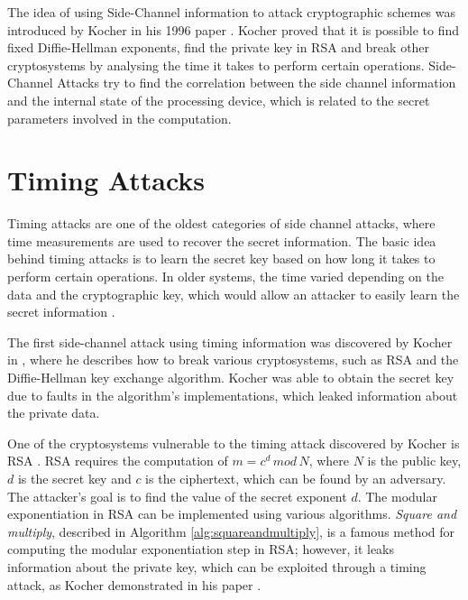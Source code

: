 \documentclass[10pt,a4paper,twoside]{book}
\begin{document}
The idea of using Side-Channel information to attack cryptographic schemes was introduced by Kocher in his 1996 paper \cite{kocher1996timing}. Kocher proved that it is possible to find fixed Diffie-Hellman \cite{diffie1976new} exponents, find the private key in RSA \cite{rivest1978method} and break other cryptosystems by analysing the time it takes to perform certain operations. Side-Channel Attacks try to find the correlation between the side channel information and the internal state of the processing device, which is related to the secret parameters involved in the computation. 

\section{Timing Attacks}
\label{tb:timingattacks}

Timing attacks are one of the oldest categories of side channel attacks, where time measurements are used to recover the secret information. The basic idea behind timing attacks is to learn the secret key based on how long it takes to perform certain operations. In older systems, the time varied depending on the data and the cryptographic key, which would allow an attacker to easily learn the secret information \cite{Koeune2011}.

The first side-channel attack using timing information was discovered by Kocher in \cite{kocher1996timing}, where he describes how to break various cryptosystems, such as RSA \cite{rivest1978method} and the Diffie-Hellman \cite{diffie1976new} key exchange algorithm. Kocher was able to obtain the secret key due to faults in the algorithm's implementations, which leaked information about the private data.

One of the cryptosystems vulnerable to the timing attack discovered by Kocher \cite{kocher1996timing} is RSA \cite{rivest1978method}. RSA requires the computation of $m = c^d \, mod \, N$, where $N$ is the public key, $d$ is the secret key and $c$ is the ciphertext, which can be found by an adversary. The attacker's goal is to find the value of the secret exponent $d$. The modular exponentiation in RSA can be implemented using various algorithms. \textit{Square and multiply}, described in Algorithm \ref{alg:squareandmultiply}, is a famous method for computing the modular exponentiation step in RSA; however, it leaks information about the private key, which can be exploited through a timing attack, as Kocher demonstrated in his paper \cite{kocher1996timing}.
\end{document}
